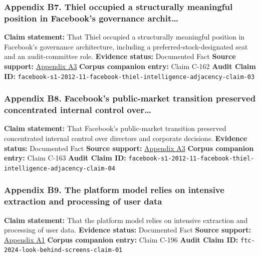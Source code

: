 \documentclass[
  american,
  11pt,
  letterpaper,
]{article}
\begin{document}
\subsubsection{Appendix B7. Thiel occupied a structurally meaningful
position in Facebook's governance
archit\ldots{}}\label{ch-01-appendix-b7-thiel-occupied-a-structurally-meaningful-position-in-facebook-s-governance-archit}

\textbf{Claim statement:} That Thiel occupied a structurally meaningful
position in Facebook's governance architecture, including a
preferred-stock-designated seat and an audit-committee role.
\textbf{Evidence status:} Documented Fact \textbf{Source support:}
\hyperref[ch-01-appendix-a3-facebook-inc-registration-statement-on-form-s-1]{Appendix
A3} \textbf{Corpus companion entry:} Claim C-162 \textbf{Audit Claim
ID:}
\texttt{facebook-s1-2012-11-facebook-thiel-intelligence-adjacency-claim-03}

\subsubsection{Appendix B8. Facebook's public-market transition
preserved concentrated internal control
over\ldots{}}\label{ch-01-appendix-b8-facebook-s-public-market-transition-preserved-concentrated-internal-control-over}

\textbf{Claim statement:} That Facebook's public-market transition
preserved concentrated internal control over directors and corporate
decisions. \textbf{Evidence status:} Documented Fact \textbf{Source
support:}
\hyperref[ch-01-appendix-a3-facebook-inc-registration-statement-on-form-s-1]{Appendix
A3} \textbf{Corpus companion entry:} Claim C-163 \textbf{Audit Claim
ID:}
\texttt{facebook-s1-2012-11-facebook-thiel-intelligence-adjacency-claim-04}

\subsubsection{Appendix B9. The platform model relies on intensive
extraction and processing of user
data}\label{ch-01-appendix-b9-the-platform-model-relies-on-intensive-extraction-and-processing-of-user-data}

\textbf{Claim statement:} That the platform model relies on intensive
extraction and processing of user data. \textbf{Evidence status:}
Documented Fact \textbf{Source support:}
\hyperref[ch-01-appendix-a1-a-look-behind-the-screens-examining-the-data-practices-of-social-media-and-video-streaming-services]{Appendix
A1} \textbf{Corpus companion entry:} Claim C-196 \textbf{Audit Claim
ID:} \texttt{ftc-2024-look-behind-screens-claim-01}
\end{document}
